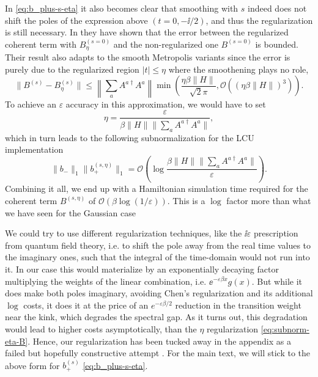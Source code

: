 In \eqref{eq:b_plus-s-eta} it also becomes clear that smoothing with $s$ indeed does not shift the poles of the expression above $(t = 0, -\ii / 2)$, and thus the regularization is still necessary. 
In \cite[Corollary III.2]{chen2023efficient} they have shown that the error between the regularized coherent term with $B^{(s = 0)}_\eta$ and the non-regularized one $B^{(s = 0)}$ is bounded. Their result also adapts to the smooth Metropolis variants since the error is purely due to the regularized region $|t| \leq \eta$ where the smoothening plays no role, 
\begin{equation}
    \|B^{(s)} - B_\eta^{(s)} \| \leq \left\|\sum_a A^{a\dagger}A^a\right\| \min\left(\frac{\eta\beta\|H\|}{\sqrt{2}\pi}, \mathcal{O}\left(\left(\eta \beta \|H\|\right)^3\right)\right).
\end{equation}
To achieve an $\varepsilon$ accuracy in this approximation, we would have to set
\begin{equation}
    \eta = \frac{\varepsilon}{\beta \|H\| \|\sum_a A^{a\dagger}A^a\|},
\end{equation}
which in turn leads to the following subnormalization for the LCU implementation
\begin{equation} \label{eq:subnorm-eta-B}
    \|b_-\|_1 \|b_+^{(s,\eta)}\|_1 = \mathcal{O}\left(\log\frac{\beta \|H\| \|\sum_a A^{a\dagger}A^a\| }{\varepsilon}\right).
\end{equation}
Combining it all, we end up with a Hamiltonian simulation time required for the coherent term $B^{(s, \eta)}$ of $\mathcal{O}(\beta \log(1 / \varepsilon))$. This is a $\log$ factor more than what we have seen for the Gaussian case

We could try to use different regularization techniques, like the $\ii \varepsilon$ prescription from quantum field theory, i.e. to shift the pole away from the real time values to the imaginary ones, such that the integral of the time-domain would not run into it. In our case this would materialize by an exponentially decaying factor multiplying the weights of the linear combination, i.e. $\ee^{- \varepsilon \beta x} g(x)$. But while it does make both poles imaginary, avoiding Chen's regularization and its additional $\log$ costs, it does it at the price of an $e^{-\varepsilon \beta / 2}$ reduction in the transition weight near the kink, which degrades the spectral gap. As it turns out, this degradation would lead to higher costs asymptotically, than the $\eta$ regularization \eqref{eq:subnorm-eta-B}. Hence, our regularization has been tucked away in the appendix as a failed but hopefully constructive attempt . For the main text, we will stick to the above form for $b_+^{(s)}$ \eqref{eq:b_plus-s-eta}.

